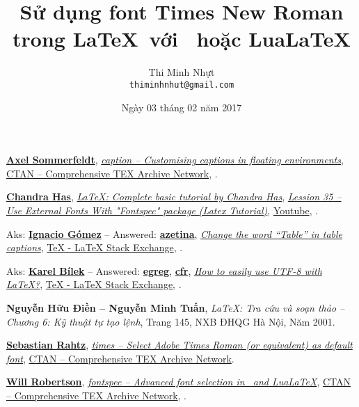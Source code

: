 \documentclass[12pt,a4paper]{article}
\title{\bfseries \huge Sử dụng font Times New Roman trong \LaTeX\ với \XeLaTeX\ hoặc Lua\LaTeX}
\author{\Large Thi Minh Nhựt \bigskip \\  \Large \texttt{thiminhnhut@gmail.com}}
\date{\Large Ngày 03 tháng 02 năm 2017}
\begin{document}
\maketitle
\tableofcontents

\begin{thebibliography}{}
   \href{https://www.ctan.org/author/sommerfeldt}{\textbf{Axel Sommerfeldt}}, \href{https://www.ctan.org/pkg/caption}{\emph{caption – Customising captions in floating environments}}, \href{https://www.ctan.org/}{CTAN -- Comprehensive TEX Archive Network}, .

   \href{https://goo.gl/quEV70}{\textbf{Chandra Has}}, \href{https://goo.gl/ljfpxm}{\emph{LaTeX: Complete basic tutorial by Chandra Has}}, \href{https://goo.gl/xiJ8hm}{\emph{Lession 35 -- Use External Fonts With "Fontspec" package (Latex Tutorial)}}, \href{https://www.youtube.com/}{Youtube}, .

   Aks: \href{https://goo.gl/Iv3GDx}{\textbf{Ignacio Gómez}} -- Answered: \href{https://goo.gl/I4Lbvw}{\textbf{azetina}}, \href{https://goo.gl/2wcY14}{\emph{Change the word ``Table'' in table captions}}, \href{http://tex.stackexchange.com/}{TeX - LaTeX Stack Exchange}, .

   Aks: \href{https://goo.gl/oHHZ2J}{\textbf{Karel Bílek}} -- Answered: \href{https://goo.gl/Wk6MGR}{\textbf{egreg}}, \href{https://goo.gl/JMexOO}{\textbf{cfr}}, \href{https://goo.gl/ITcJ7j}{\emph{How to easily use UTF-8 with LaTeX?}}, \href{http://tex.stackexchange.com/}{TeX - LaTeX Stack Exchange}, .

   \textbf{Nguyễn Hữu Điền -- Nguyễn Minh Tuấn}, \emph{\LaTeX: Tra cứu và soạn thảo -- Chương 6: Kỹ thuật tự tạo lệnh}, Trang 145, NXB ĐHQG Hà Nội, Năm 2001.

   \href{https://www.ctan.org/author/rahtz}{\textbf{Se­bas­tian Rahtz}}, \href{https://www.ctan.org/pkg/times}{\emph{times – Select Adobe Times Roman (or equivalent) as default font}}, \href{https://www.ctan.org/}{CTAN -- Comprehensive TEX Archive Network}.

   \href{https://www.ctan.org/author/robertson}{\textbf{Will Robertson}}, \href{https://www.ctan.org/pkg/fontspec}{\emph{fontspec – Advanced font selection in \XeLaTeX\ and Lua\LaTeX}}, \href{https://www.ctan.org/}{CTAN -- Comprehensive TEX Archive Network}, .
\end{thebibliography}
\end{document}
